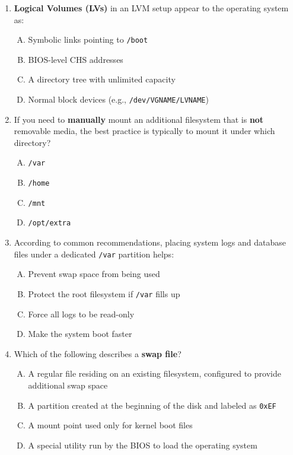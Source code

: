 \documentclass[a4paper]{report}
\begin{document}
\begin{enumerate}[1.]
    \item \textbf{Logical Volumes (LVs)} in an LVM setup appear to the operating system as:  
    \begin{enumerate}[A)]
        \item Symbolic links pointing to \texttt{/boot}  
        \item BIOS-level CHS addresses  
        \item A directory tree with unlimited capacity  
        \item Normal block devices (e.g., \texttt{/dev/VGNAME/LVNAME})  
    \end{enumerate}

    \item If you need to \textbf{manually} mount an additional filesystem that is \textbf{not} removable media, the best practice is typically to mount it under which directory?  
    \begin{enumerate}[A)]
        \item \texttt{/var}  
        \item \texttt{/home}  
        \item \texttt{/mnt}  
        \item \texttt{/opt/extra}  
    \end{enumerate}

    \item According to common recommendations, placing system logs and database files under a dedicated \texttt{/var} partition helps:  
    \begin{enumerate}[A)]
        \item Prevent swap space from being used  
        \item Protect the root filesystem if \texttt{/var} fills up  
        \item Force all logs to be read-only  
        \item Make the system boot faster  
    \end{enumerate}

    \item Which of the following describes a \textbf{swap file}?  
    \begin{enumerate}[A)]
        \item A regular file residing on an existing filesystem, configured to provide additional swap space  
        \item A partition created at the beginning of the disk and labeled as \texttt{0xEF}  
        \item A mount point used only for kernel boot files  
        \item A special utility run by the BIOS to load the operating system  
    \end{enumerate}

\end{enumerate}
\newpage
\end{document}
